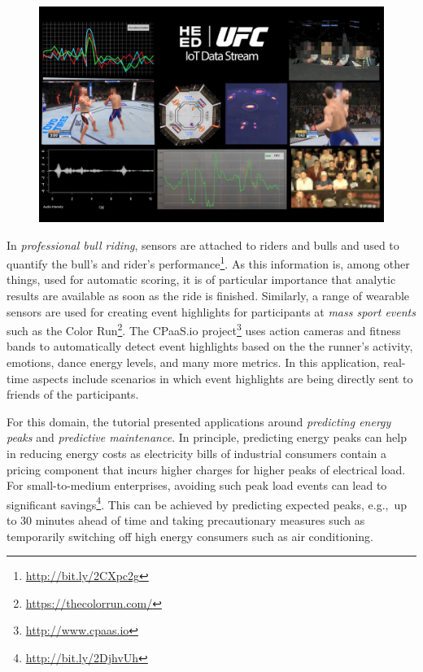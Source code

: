 \begin{figure}[t]
\centering
\includegraphics[scale=0.142]{pictures/DP6L8S9XkAYFMCw.jpg}
\vspace*{-1mm}
\label{FIG:FightStreams}
\vspace*{-2mm}
\end{figure}

In \emph{professional bull riding}, sensors are attached to riders and
bulls and used to quantify the bull's and rider's
performance\footnote{\url{http://bit.ly/2CXpc2g}}. As this information
is, among other things, used for automatic scoring, it is of
particular importance that analytic results are available as soon as
the ride is finished. Similarly, a range of wearable sensors are used
for creating event highlights for participants at \emph{mass sport
  events} such as the Color
Run\footnote{\url{https://thecolorrun.com/}}. The \textsf{\small
  CPaaS.io} project\footnote{\url{http://www.cpaas.io}} uses action
cameras and fitness bands to automatically detect event highlights
based on the the runner's activity, emotions, dance energy levels, and
many more metrics. In this application, real-time aspects include
scenarios in which event highlights are being directly sent to friends
of the participants.

For this domain, the tutorial presented applications around \emph{predicting energy peaks} and \emph{predictive maintenance}. In principle, predicting energy peaks can help in reducing energy costs as electricity bills of industrial consumers contain a pricing component that incurs higher charges for higher peaks of electrical load. For small-to-medium enterprises, avoiding such peak load events can lead to significant savings\footnote{\url{http://bit.ly/2DjhvUh}}. This can be achieved by predicting expected peaks, e.g.,\ up to 30 minutes ahead of time and taking precautionary measures such as temporarily switching off high energy consumers such as air conditioning.

